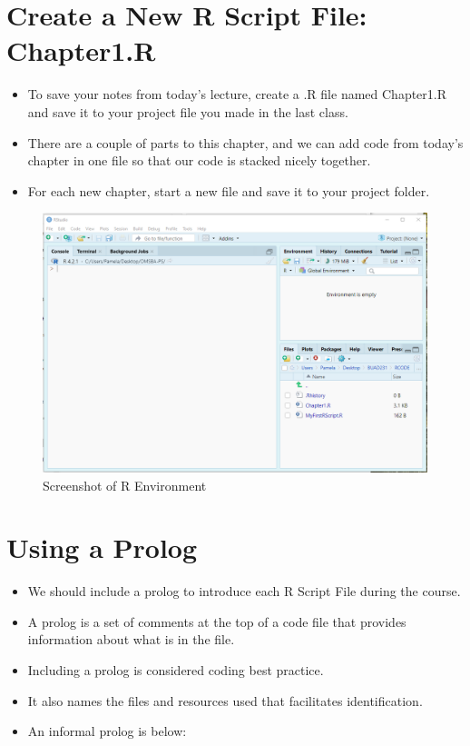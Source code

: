 \documentclass[
  letterpaper,
  DIV=11,
  numbers=noendperiod]{scrreprt}
\providecommand{\tightlist}{%
  \setlength{\itemsep}{0pt}\setlength{\parskip}{0pt}}\usepackage{longtable,booktabs,array}
\begin{document}
\section{Create a New R Script File:
Chapter1.R}\label{create-a-new-r-script-file-chapter1.r}

\begin{itemize}
\tightlist
\item
  To save your notes from today's lecture, create a .R file named
  Chapter1.R and save it to your project file you made in the last
  class.
\item
  There are a couple of parts to this chapter, and we can add code from
  today's chapter in one file so that our code is stacked nicely
  together.\\
\item
  For each new chapter, start a new file and save it to your project
  folder.
\end{itemize}

\begin{figure}[H]

{\centering \includegraphics{Pictures/Ch1/RScript.png}

}

\caption{Screenshot of R Environment}

\end{figure}%

\section{Using a Prolog}\label{using-a-prolog}

\begin{itemize}
\tightlist
\item
  We should include a prolog to introduce each R Script File during the
  course.
\item
  A prolog is a set of comments at the top of a code file that provides
  information about what is in the file.
\item
  Including a prolog is considered coding best practice.
\item
  It also names the files and resources used that facilitates
  identification.
\item
  An informal prolog is below:
\end{itemize}
\end{document}

